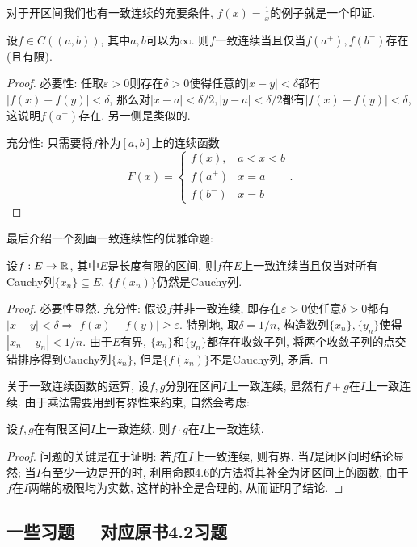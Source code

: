 对于开区间我们也有一致连续的充要条件, $f(x)=\frac{1}{x}$的例子就是一个印证. 

\begin{proposition}{}
	设$f \in C((a,b))$, 其中$a,b$可以为$\infty$. 则$f$一致连续当且仅当$f(a^+),f(b^-)$存在(且有限). 
\end{proposition}
\begin{proof}
	必要性: 任取$\varepsilon >0$则存在$\delta >0$使得任意的$|x-y|<\delta$都有$|f(x)-f(y)|<\delta$, 那么对$|x-a|<\delta /2, |y-a|<\delta /2$都有$|f(x)-f(y)|<\delta$, 这说明$f(a^+)$存在. 另一侧是类似的. 
	
	充分性: 只需要将$f$补为$[a,b]$上的连续函数$$F(x)=\begin{cases}
 f(x), & a<x<b \\
 f(a^+) & x=a \\
 f(b^-) & x=b
\end{cases}.$$
\end{proof}

最后介绍一个刻画一致连续性的优雅命题: 

\begin{proposition}{}
	设$f:E \to \mathbb{R}$, 其中$E$是长度有限的区间, 则$f$在$E$上一致连续当且仅当对所有Cauchy列$\{ x_n \} \subseteq E$, $\{ f(x_n) \}$仍然是Cauchy列. 
\end{proposition}
\begin{proof}
	必要性显然. 充分性: 假设$f$并非一致连续, 即存在$\varepsilon >0$使任意$\delta >0$都有$|x-y|<\delta \Rightarrow |f(x)-f(y)| \geq \varepsilon$. 特别地, 取$\delta = 1/n$, 构造数列$\{ x_n \},\{ y_n \}$使得$|x_n-y_n|<1/n$. 由于$E$有界, $\{ x_n \}$和$\{ y_n \}$都存在收敛子列, 将两个收敛子列的点交错排序得到Cauchy列$\{ z_n \}$, 但是$\{ f(z_n) \}$不是Cauchy列, 矛盾. 
\end{proof}

关于一致连续函数的运算, 设$f,g$分别在区间$I$上一致连续, 显然有$f+g$在$I$上一致连续. 由于乘法需要用到有界性来约束, 自然会考虑: 

\begin{proposition}{}
	设$f,g$在有限区间$I$上一致连续, 则$f \cdot g$在$I$上一致连续. 
\end{proposition}
\begin{proof}
	问题的关键是在于证明: 若$f$在$I$上一致连续, 则有界. 当$I$是闭区间时结论显然; 当$I$有至少一边是开的时, 利用命题4.6的方法将其补全为闭区间上的函数, 由于$f$在$I$两端的极限均为实数, 这样的补全是合理的, 从而证明了结论. 
\end{proof}

\newpage
\subsection*{一些习题 ~~\small 对应原书4.2习题}
















